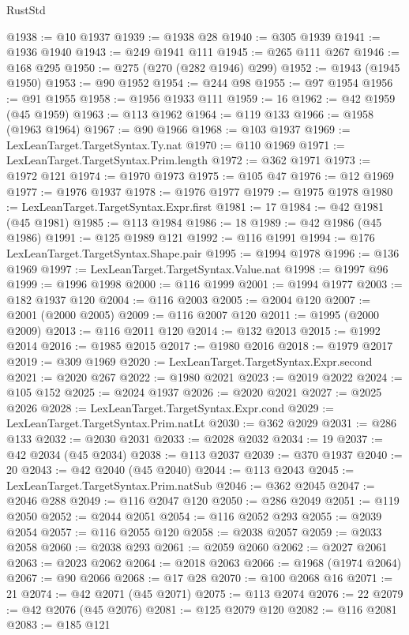 \begin{lexlean}{RustStd}
\begin{coremodule}
@1938 := @10 @1937
@1939 := @1938 @28
@1940 := @305 @1939
@1941 := @1936 @1940
@1943 := @249 @1941 @111
@1945 := @265 @111 @267
@1946 := @168 @295
@1950 := @275 (@270 (@282 @1946) @299)
@1952 := @1943 (@1945 @1950)
@1953 := @90 @1952
@1954 := @244 @98
@1955 := @97 @1954
@1956 := @91 @1955
@1958 := @1956 @1933 @111
@1959 := 16
@1962 := @42 @1959 (@45 @1959)
@1963 := @113 @1962
@1964 := @119 @133
@1966 := @1958 (@1963 @1964)
@1967 := @90 @1966
@1968 := @103 @1937
@1969 := LexLeanTarget.TargetSyntax.Ty.nat
@1970 := @110 @1969
@1971 := LexLeanTarget.TargetSyntax.Prim.length
@1972 := @362 @1971
@1973 := @1972 @121
@1974 := @1970 @1973
@1975 := @105 @47
@1976 := @12 @1969
@1977 := @1976 @1937
@1978 := @1976 @1977
@1979 := @1975 @1978
@1980 := LexLeanTarget.TargetSyntax.Expr.first
@1981 := 17
@1984 := @42 @1981 (@45 @1981)
@1985 := @113 @1984
@1986 := 18
@1989 := @42 @1986 (@45 @1986)
@1991 := @125 @1989 @121
@1992 := @116 @1991
@1994 := @176 LexLeanTarget.TargetSyntax.Shape.pair
@1995 := @1994 @1978
@1996 := @136 @1969
@1997 := LexLeanTarget.TargetSyntax.Value.nat
@1998 := @1997 @96
@1999 := @1996 @1998
@2000 := @116 @1999
@2001 := @1994 @1977
@2003 := @182 @1937 @120
@2004 := @116 @2003
@2005 := @2004 @120
@2007 := @2001 (@2000 @2005)
@2009 := @116 @2007 @120
@2011 := @1995 (@2000 @2009)
@2013 := @116 @2011 @120
@2014 := @132 @2013
@2015 := @1992 @2014
@2016 := @1985 @2015
@2017 := @1980 @2016
@2018 := @1979 @2017
@2019 := @309 @1969
@2020 := LexLeanTarget.TargetSyntax.Expr.second
@2021 := @2020 @267
@2022 := @1980 @2021
@2023 := @2019 @2022
@2024 := @105 @152
@2025 := @2024 @1937
@2026 := @2020 @2021
@2027 := @2025 @2026
@2028 := LexLeanTarget.TargetSyntax.Expr.cond
@2029 := LexLeanTarget.TargetSyntax.Prim.natLt
@2030 := @362 @2029
@2031 := @286 @133
@2032 := @2030 @2031
@2033 := @2028 @2032
@2034 := 19
@2037 := @42 @2034 (@45 @2034)
@2038 := @113 @2037
@2039 := @370 @1937
@2040 := 20
@2043 := @42 @2040 (@45 @2040)
@2044 := @113 @2043
@2045 := LexLeanTarget.TargetSyntax.Prim.natSub
@2046 := @362 @2045
@2047 := @2046 @288
@2049 := @116 @2047 @120
@2050 := @286 @2049
@2051 := @119 @2050
@2052 := @2044 @2051
@2054 := @116 @2052 @293
@2055 := @2039 @2054
@2057 := @116 @2055 @120
@2058 := @2038 @2057
@2059 := @2033 @2058
@2060 := @2038 @293
@2061 := @2059 @2060
@2062 := @2027 @2061
@2063 := @2023 @2062
@2064 := @2018 @2063
@2066 := @1968 (@1974 @2064)
@2067 := @90 @2066
@2068 := @17 @28
@2070 := @100 @2068 @16
@2071 := 21
@2074 := @42 @2071 (@45 @2071)
@2075 := @113 @2074
@2076 := 22
@2079 := @42 @2076 (@45 @2076)
@2081 := @125 @2079 @120
@2082 := @116 @2081
@2083 := @185 @121

\end{coremodule}
\end{lexlean}
